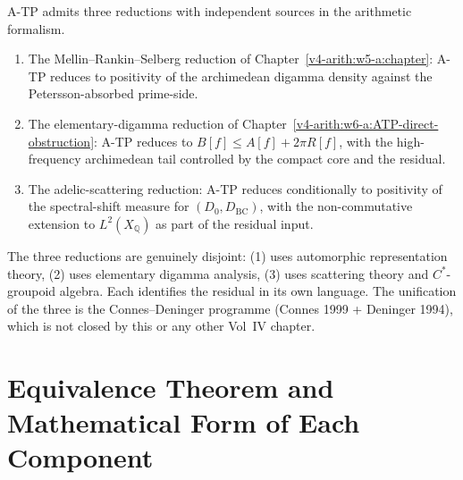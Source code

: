 \begin{remark}
\label{v4-arith:w7-j:rem:three-reductions}
A-TP admits three reductions with independent sources in the arithmetic
formalism.
\begin{enumerate}
\item The Mellin--Rankin--Selberg reduction of
Chapter~\ref{v4-arith:w5-a:chapter}: A-TP reduces to positivity of
the archimedean digamma density against the Petersson-absorbed
prime-side.
\item The elementary-digamma reduction of
Chapter~\ref{v4-arith:w6-a:ATP-direct-obstruction}: A-TP reduces to
\(B[f]\leq A[f]+2\pi R[f]\), with the high-frequency archimedean tail
controlled by the compact core and the residual.
\item The adelic-scattering reduction: A-TP
reduces conditionally to positivity of the spectral-shift measure for
\((D_{0},D_{\mathrm{BC}})\), with the non-commutative extension to
\(L^{2}(X_{\mathbb{Q}})\) as part of the residual input.
\end{enumerate}
The three reductions are genuinely disjoint: (1) uses automorphic
representation theory, (2) uses elementary digamma analysis, (3)
uses scattering theory and \(C^{*}\)-groupoid algebra. Each identifies
the residual in its own language. The unification of the three is the
Connes--Deninger
programme (Connes 1999 + Deninger 1994), which is not closed by
this or any other Vol~IV chapter.
\end{remark}

\section{Equivalence Theorem and Mathematical Form of Each Component}
\label{v4-arith:w7-j:form}

